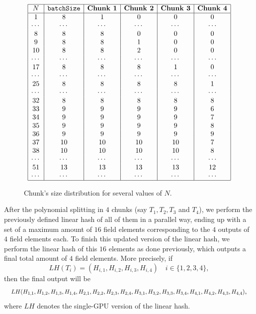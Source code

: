 \begin{figure}[h!]
	\centering
	\[
	\begin{array}{|c|c|c|c|c|c|}
	\hline
	N	&\texttt{batchSize}	&\textbf{Chunk 1}	&\textbf{Chunk 2}	&\textbf{Chunk 3}	&\textbf{Chunk 4}	\\
	\hline
	1		&8			&1				&0				&0				&0				\\
	\cdots	&\cdots		&\cdots			&\cdots			&\cdots			&\cdots			\\
	8		&8			&8				&0				&0				&0				\\
	9		&8			&8				&1				&0				&0				\\
	10		&8			&8				&2				&0				&0				\\
	\cdots	&\cdots     &\cdots			&\cdots			&\cdots			&\cdots			\\
	17		&8			&8				&8				&1				&0				\\
	\cdots	&\cdots		&\cdots			&\cdots			&\cdots			&\cdots			\\
	25		&8			&8				&8				&8				&1				\\
	\cdots	&\cdots		&\cdots			&\cdots			&\cdots			&\cdots			\\
	32		&8			&8				&8				&8				&8				\\
	33		&9			&9				&9				&9				&6				\\
	34		&9			&9				&9				&9				&7				\\
	35		&9			&9				&9				&9				&8				\\
	36		&9			&9				&9				&9				&9				\\
	37		&10			&10				&10				&10				&7				\\
	38		&10			&10				&10				&10				&8				\\
	\cdots	&\cdots		&\cdots			&\cdots			&\cdots			&\cdots			\\
	51		&13			&13				&13				&13				&12				\\
	\cdots	&\cdots		&\cdots			&\cdots			&\cdots			&\cdots			\\
	\hline
	\end{array}
	\]
	\caption{Chunk's size distribution for several values of $N$.}
	\label{tab:multi-gpu-chunks}
\end{figure}

After the polynomial splitting in $4$ chunks (say $T_1, T_2, T_3$ and $T_4$), we perform the previously defined linear hash of all of them in a parallel way, ending up with a set of a maximum amount of $16$ field elements corresponding to the $4$ outputs of $4$ field elements each. To finish this updated version of the linear hash, we perform the linear hash of this $16$ elements as done previously, which outputs a final total amount of $4$ field elements. More precisely, if 
\[
LH(T_i) = (H_{i, 1}, H_{i, 2}, H_{i, 3}, H_{i, 4})	\quad i \in \{1, 2, 3, 4\},
\]
then the final output will be
\[
\scalebox{0.85}{\mbox{\ensuremath{\displaystyle 
			LH(H_{1, 1}, H_{1, 2}, H_{1, 3}, H_{1, 4}, H_{2, 1}, H_{2, 2}, H_{2, 3}, H_{2, 4}, H_{3, 1}, H_{3, 2}, H_{3, 3}, H_{3, 4}, H_{4, 1}, H_{4, 2}, H_{4, 3}, H_{4, 4})
}}},
\]
where $LH$ denotes the single-GPU version of the linear hash. 

